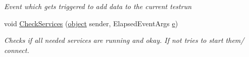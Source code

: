 \begin{DoxyCompactItemize}
\begin{DoxyCompactList}\small\item\em Event which gets triggered to add data to the current testrun \end{DoxyCompactList}\item 
void \hyperlink{class_web_analyzer_1_1_controller_1_1_test_controller_a6d70aa8b48cd7283d444e27c5b7ca8fa}{Check\+Services} (\hyperlink{_u_i_2_h_t_m_l_resources_2js_2lib_2underscore_8min_8js_aae18b7515bb2bc4137586506e7c0c903}{object} sender, Elapsed\+Event\+Args \hyperlink{_u_i_2_h_t_m_l_resources_2js_2lib_2bootstrap_8min_8js_ab5902775854a8b8440bcd25e0fe1c120}{e})
\begin{DoxyCompactList}\small\item\em Checks if all needed services are running and okay. If not tries to start them/ connect. \end{DoxyCompactList}\end{DoxyCompactItemize}
